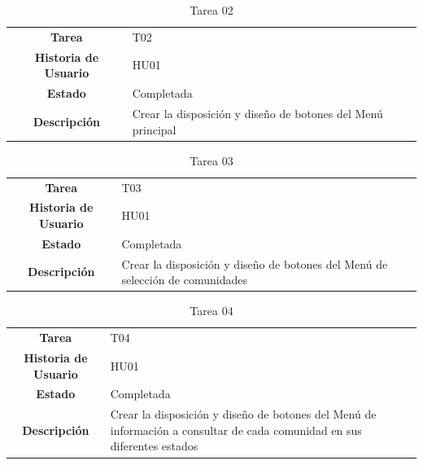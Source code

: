 \begin{table}[H]
	\begin{center}
		\begin{tabular}{| c | p{9cm} |}
			\hline
			
			\textbf{Tarea} & T02 \\
			\textbf{Historia de Usuario} & HU01 \\
			\textbf{Estado} & Completada \\
			\textbf{Descripción} & Crear la disposición y diseño de botones del Menú principal \\ \hline
		\end{tabular}
		\caption{Tarea 02}
	\end{center}
\end{table}

\begin{table}[H]
	\begin{center}
		\begin{tabular}{| c | p{9cm} |}
			\hline
			
			\textbf{Tarea} & T03 \\
			\textbf{Historia de Usuario} & HU01 \\
			\textbf{Estado} & Completada \\
			\textbf{Descripción} & Crear la disposición y diseño de botones del Menú de selección de comunidades \\ \hline
		\end{tabular}
		\caption{Tarea 03}
	\end{center}
\end{table}

\begin{table}[H]
	\begin{center}
		\begin{tabular}{| c | p{9cm} |}
			\hline
			
			\textbf{Tarea} & T04 \\
			\textbf{Historia de Usuario} & HU01 \\
			\textbf{Estado} & Completada \\
			\textbf{Descripción} & Crear la disposición y diseño de botones del Menú de información a consultar de cada comunidad en sus diferentes estados \\ \hline
		\end{tabular}
		\caption{Tarea 04}
	\end{center}
\end{table}

